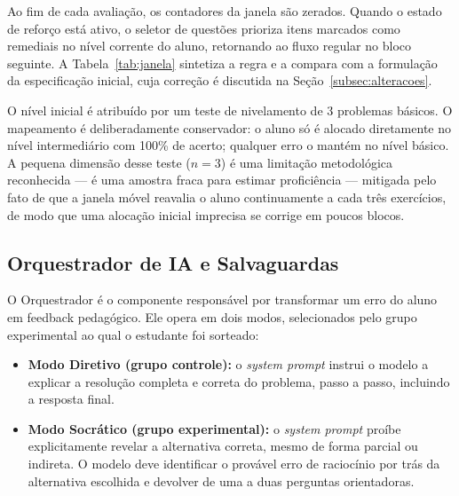 \documentclass[10pt, a4paper, twocolumn]{article}
\begin{document}
Ao fim de cada avaliação, os contadores da janela são zerados. Quando o estado de
reforço está ativo, o seletor de questões prioriza itens marcados como
remediais no nível corrente do aluno, retornando ao fluxo regular no bloco
seguinte. A Tabela~\ref{tab:janela} sintetiza a regra e a compara com a
formulação da especificação inicial, cuja correção é discutida na
Seção~\ref{subsec:alteracoes}.

\begin{table}[H]
\centering
\small
\caption{Regra da janela móvel de 3 exercícios}
\label{tab:janela}
\vspace{0.13cm}
\end{table}

O nível inicial é atribuído por um teste de nivelamento de 3 problemas básicos.
O mapeamento é deliberadamente conservador: o aluno só é alocado diretamente no
nível intermediário com 100\% de acerto; qualquer erro o mantém no nível básico.
A pequena dimensão desse teste ($n = 3$) é uma limitação metodológica
reconhecida --- é uma amostra fraca para estimar proficiência --- mitigada pelo
fato de que a janela móvel reavalia o aluno continuamente a cada três
exercícios, de modo que uma alocação inicial imprecisa se corrige em poucos
blocos.

\subsection{Orquestrador de IA e Salvaguardas}
\label{subsec:orquestrador}

O Orquestrador é o componente responsável por transformar um erro do aluno em
feedback pedagógico. Ele opera em dois modos, selecionados pelo grupo
experimental ao qual o estudante foi sorteado:

\begin{itemize}[leftmargin=0.4cm, itemsep=3pt]
    \item \textbf{Modo Diretivo (grupo controle):} o \textit{system prompt}
    instrui o modelo a explicar a resolução completa e correta do problema,
    passo a passo, incluindo a resposta final.
    \item \textbf{Modo Socrático (grupo experimental):} o \textit{system prompt}
    proíbe explicitamente revelar a alternativa correta, mesmo de forma parcial
    ou indireta. O modelo deve identificar o provável erro de raciocínio por trás
    da alternativa escolhida e devolver de uma a duas perguntas orientadoras.
\end{itemize}
\end{document}
